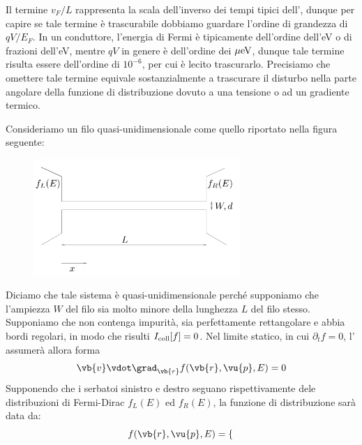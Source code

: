 Il termine $v_F/L$ rappresenta la scala dell'inverso dei tempi tipici dell', dunque per capire se tale termine è trascurabile dobbiamo guardare l'ordine di grandezza di $qV/E_F$. In un conduttore, l'energia di Fermi è tipicamente dell'ordine dell'eV o di frazioni dell'eV, mentre $qV$ in genere è dell'ordine dei $\rm \mu eV$, dunque tale termine risulta essere dell'ordine di $10^{-6}$, per cui è lecito trascurarlo. Precisiamo che omettere tale termine equivale sostanzialmente a trascurare il disturbo nella parte angolare della funzione di distribuzione dovuto a una tensione o ad un gradiente termico.
\begin{example}
    Consideriamo un filo quasi-unidimensionale come quello riportato nella figura seguente:
    \begin{figure}[H]
        \centering
        \includegraphics[width=0.7\textwidth]{Immagini/Ballistic_wire.png}
    \end{figure}
    Diciamo che tale sistema è quasi-unidimensionale perché supponiamo che l'ampiezza $W$ del filo sia molto minore della lunghezza $L$ del filo stesso.\\
    Supponiamo che non contenga impurità, sia perfettamente rettangolare e abbia bordi regolari, in modo che risulti $I_{\rm coll}[f]=0$. Nel limite statico, in cui $\partial_t f=0$, l' assumerà allora forma
    \begin{equation*}
        \vb{v} \vdot \grad_{\vb{r}} f(\vb{r},\vu{p},E)
        =0
    \end{equation*}
    Supponendo che i serbatoi sinistro e destro seguano rispettivamente dele distribuzioni di Fermi-Dirac $f_L(E)$ ed $f_R(E)$, la funzione di distribuzione sarà data da:
    \begin{equation*}
        f(\vb{r},\vu{p},E)
        =
        \begin{cases}

\end{cases}
\end{equation*}
\end{example}
